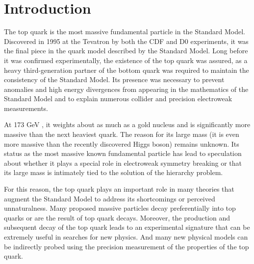 
\chapter{Introduction}

%



The top quark is the most massive fundamental particle in the Standard Model.
Discovered in 1995 at the Tevatron by both the CDF and D0 experiments, it was the final piece in the quark model described by the Standard Model. %
Long before it was confirmed experimentally, the existence of the top quark was assured,
as a heavy third-generation partner of the bottom quark was required to maintain the consistency of the Standard Model.%
Its presence was necessary to prevent anomalies and high energy divergences from appearing in the mathematics of the Standard Model
and to explain numerous collider and precision electroweak measurements.


At 173 GeV \cite{PARTICLE_DATA_GROUP}, it weights about as much as a gold nucleus and is significantly more massive than the next heaviest quark.
The reason for its large mass (it is even more massive than the recently discovered Higgs boson) remains unknown.
Its status as the most massive known fundamental particle has lead to speculation about whether it plays a special role in electroweak symmetry breaking
or that its large mass is intimately tied to the solution of the hierarchy problem.

For this reason, the top quark plays an important role in many theories that augment the Standard Model to address its shortcomings or perceived unnaturalness.
Many proposed massive particles decay preferentially into top quarks or are the result of top quark decays.
Moreover, the production and subsequent decay of the top quark leads to an experimental signature that can be extremely useful in searches for new physics.
And many new physical models can be indirectly probed using the precision measurement of the properties of the top quark.

